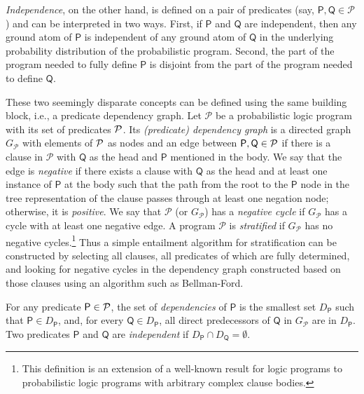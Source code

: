 \emph{Independence}, on the other hand, is defined on a pair of predicates (say,
$\mathsf{P}, \mathsf{Q} \in \mathcal{P}$) and can be interpreted in two ways.
First, if $\mathsf{P}$ and $\mathsf{Q}$ are independent, then any ground atom of
$\mathsf{P}$ is independent of any ground atom of $\mathsf{Q}$ in the underlying
probability distribution of the probabilistic program. Second, the part of the
program needed to fully define $\mathsf{P}$ is disjoint from the part of the
program needed to define $\mathsf{Q}$.

These two seemingly disparate concepts can be defined using the same building
block, i.e., a predicate dependency graph. Let $\mathscr{P}$ be a probabilistic
logic program with its set of predicates $\mathcal{P}{}$. Its \emph{(predicate)
  dependency graph} is a directed graph $G_{\mathscr{P}}$ with elements of
$\mathcal{P}{}$ as nodes and an edge between $\mathsf{P}, \mathsf{Q} \in
\mathcal{P}{}$ if there is a clause in $\mathscr{P}$ with $\mathsf{Q}$ as the
head and $\mathsf{P}$ mentioned in the body. We say that the edge is
\emph{negative} if there exists a clause with $\mathsf{Q}$ as the head and at
least one instance of $\mathsf{P}$ at the body such that the path from the root
to the $\mathsf{P}$ node in the tree representation of the clause passes through
at least one negation node; otherwise, it is \emph{positive}. We say that
$\mathscr{P}$ (or $G_{\mathscr{P}}$) has a \emph{negative cycle} if
$G_{\mathscr{P}}$ has a cycle with at least one negative edge. A program
$\mathscr{P}$ is \emph{stratified} if $G_{\mathscr{P}}$ has no negative
cycles.\footnote{This definition is an extension of a well-known result for
  logic programs \citep{DBLP:journals/jlp/BalbinPRM91} to probabilistic logic
  programs with arbitrary complex clause bodies.} Thus a simple entailment
algorithm for stratification can be constructed by selecting all clauses, all
predicates of which are fully determined, and looking for negative cycles in the
dependency graph constructed based on those clauses using an algorithm such as
Bellman-Ford.

For any predicate $\mathsf{P} \in \mathcal{P}{}$, the set of \emph{dependencies}
of $\mathsf{P}$ is the smallest set $D_{\mathsf{P}}$ such that $\mathsf{P} \in
D_{\mathsf{P}}$, and, for every $\mathsf{Q} \in D_{\mathsf{P}}$, all direct
predecessors of $\mathsf{Q}$ in $G_{\mathscr{P}}$ are in $D_{\mathsf{P}}$. Two
predicates $\mathsf{P}$ and $\mathsf{Q}$ are \emph{independent} if
$D_{\mathsf{P}} \cap D_{\mathsf{Q}} = \emptyset$.

